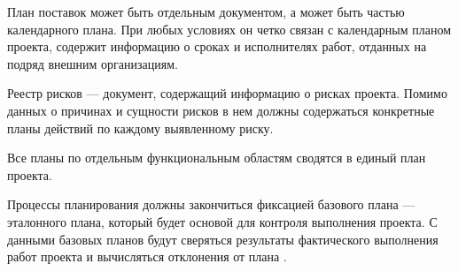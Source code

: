План поставок может быть отдельным документом, а может быть частью календарного плана. 
При любых условиях он четко связан с календарным планом проекта, содержит информацию о сроках и ис­полнителях работ, отданных на подряд внешним организациям.

Реестр рисков --- документ, содержащий информацию о рисках проекта.
Помимо данных о причинах и сущности рисков в нем долж­ны содержаться конкретные планы действий по каждому выявленно­му риску.

Все планы по отдельным функциональным областям сводятся в единый план проекта.

Процессы планирования должны закончиться фиксацией базово­го плана --- эталонного плана, который будет основой для контро­ля выполнения проекта. 
С данными базовых планов будут сверяться результаты фактического выполнения работ проекта и вычисляться отклонения от плана \cite[174--175]{polkovnikov}.






